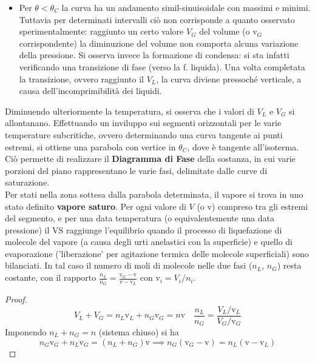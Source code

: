 \documentclass[10pt, oneside]{book}
\newcommand{\molvol}{\mathrm{v}}
\begin{document}
\begin{itemize}[label=$\square$]
\begin{proof}
Viceversa è anche possibile ricavare le costanti di Van der Waals dalla \textbf{curva critica} secondo:
\[a = \frac{9}{8} R \theta_C \molvol_C \quad \quad \quad b = \frac{\molvol_C}{3}\]
\end{proof}
\item Per $\theta < \theta_C$ la curva ha un andamento simil-sinuisoidale con massimi e minimi. Tuttavia per determinati intervalli ciò non corrisponde a quanto osservato sperimentalmente: raggiunto un certo valore $V_G$ del volume (o $\molvol_G$ corrispondente) la diminuzione del volume non comporta alcuna variazione della pressione. Si osserva invece la formazione di condensa: si sta infatti verificando una transizione di fase (verso la f. liquida). Una volta completata la transizione, ovvero raggiunto il $V_L$, la curva diviene pressoché verticale, a causa dell'incomprimibilità dei liquidi.
\end{itemize}
Diminuendo ulteriormente la temperatura, si osserva che i valori di $V_L$ e $V_G$ si allontanano. Effettuando un inviluppo sui segmenti orizzontali per le varie temperature subcritiche, ovvero determinando una curva tangente ai punti estremi, si ottiene una parabola con vertice in $\theta_C$, dove è tangente all'isoterma.
\\Ciò permette di realizzare il \textbf{Diagramma di Fase} della sostanza, in cui varie porzioni del piano rappresentano le varie fasi, delimitate dalle curve di saturazione.
\\Per stati nella zona sottesa dalla parabola determinata, il vapore si trova in uno stato definito \textbf{vapore saturo}. Per ogni valore di $V$ (o $\molvol$) compreso tra gli estremi del segmento, e per una data temperatura (o equivalentemente una data pressione) il VS raggiunge l'equilibrio quando il processo di liquefazione di molecole del vapore (a causa degli urti anelastici con la superficie) e quello di evaporazione ('liberazione' per agitazione termica delle molecole superficiali) sono bilanciati. In tal caso il numero di moli di molecole nelle due fasi ($n_L$, $n_G$) resta costante, con il rapporto $\displaystyle \frac{n_L}{n_G} = \frac{\molvol_G - \molvol}{\molvol - \molvol_L}$ con $\molvol_i = V_i \big/ n_i$.
\begin{proof}
\[V_L + V_G = n_L \molvol_L + n_G \molvol_G = n \molvol \quad \frac{n_L}{n_G} = \frac{V_L \big/ \molvol_L}{V_G \big/ \molvol_G}\]
Imponendo $n_L + n_G = n$ (sistema chiuso) si ha
\[n_G \molvol_G + n_L \molvol_G = (n_L + n_G) \molvol \implies n_G(\molvol_G - \molvol) = n_L (\molvol - \molvol_L)\]
\end{proof}
\end{document}
